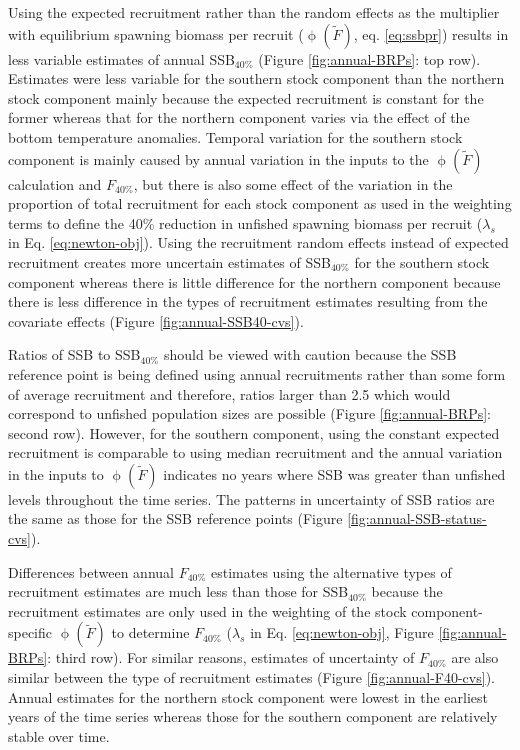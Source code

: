 \documentclass[
]{article}
\begin{document}
Using the expected recruitment rather than the random effects as the multiplier with equilibrium spawning biomass per recruit (\(\upphi(\widetilde{F})\), eq. \ref{eq:ssbpr}) results in less variable estimates of annual SSB\(_{40\%}\) (Figure \ref{fig:annual-BRPs}: top row). Estimates were less variable for the southern stock component than the northern stock component mainly because the expected recruitment is constant for the former whereas that for the northern component varies via the effect of the bottom temperature anomalies. Temporal variation for the southern stock component is mainly caused by annual variation in the inputs to the \(\upphi(\widetilde{F})\) calculation and \(F_{40\%}\), but there is also some effect of the variation in the proportion of total recruitment for each stock component as used in the weighting terms to define the 40\% reduction in unfished spawning biomass per recruit (\(\lambda_s\) in Eq. \ref{eq:newton-obj}). Using the recruitment random effects instead of expected recruitment creates more uncertain estimates of SSB\(_{40\%}\) for the southern stock component whereas there is little difference for the northern component because there is less difference in the types of recruitment estimates resulting from the covariate effects (Figure \ref{fig:annual-SSB40-cvs}).

Ratios of SSB to SSB\(_{40\%}\) should be viewed with caution because the SSB reference point is being defined using annual recruitments rather than some form of average recruitment and therefore, ratios larger than 2.5 which would correspond to unfished population sizes are possible (Figure \ref{fig:annual-BRPs}: second row). However, for the southern component, using the constant expected recruitment is comparable to using median recruitment and the annual variation in the inputs to \(\upphi(\widetilde{F})\) indicates no years where SSB was greater than unfished levels throughout the time series. The patterns in uncertainty of SSB ratios are the same as those for the SSB reference points (Figure \ref{fig:annual-SSB-status-cvs}).

Differences between annual \(F_{40\%}\) estimates using the alternative types of recruitment estimates are much less than those for SSB\(_{40\%}\) because the recruitment estimates are only used in the weighting of the stock component-specific \(\upphi(\widetilde{F})\) to determine \(F_{40\%}\) (\(\lambda_s\) in Eq. \ref{eq:newton-obj}, Figure \ref{fig:annual-BRPs}: third row). For similar reasons, estimates of uncertainty of \(F_{40\%}\) are also similar between the type of recruitment estimates (Figure \ref{fig:annual-F40-cvs}). Annual estimates for the northern stock component were lowest in the earliest years of the time series whereas those for the southern component are relatively stable over time.
\end{document}
